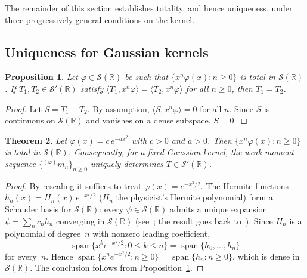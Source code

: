\documentclass[12pt]{article}
\newtheorem{theorem}{Theorem}[section]
\newtheorem{proposition}[theorem]{Proposition}
\theoremstyle{definition}
\newcommand{\R}{\mathbb{R}}
\begin{document}
The remainder of this section establishes totality, and hence uniqueness, under three progressively general conditions on the kernel.

\subsection{Uniqueness for Gaussian kernels}
\label{subsec:gauss-unique}

\begin{proposition}\label{prop:total-unique}
Let $\varphi \in \mathcal{S}(\R)$ be such that $\{x^n\varphi(x) : n \geq 0\}$ is total in $\mathcal{S}(\R)$.  If $T_1, T_2 \in \mathcal{S}'(\R)$ satisfy $\langle T_1, x^n\varphi\rangle = \langle T_2, x^n\varphi\rangle$ for all $n \geq 0$, then $T_1 = T_2$.
\end{proposition}

\begin{proof}
Let $S = T_1 - T_2$.  By assumption, $\langle S, x^n\varphi\rangle = 0$ for all $n$.  Since $S$ is continuous on $\mathcal{S}(\R)$ and vanishes on a dense subspace, $S = 0$.
\end{proof}

\begin{theorem}\label{thm:gauss-unique}
Let $\varphi(x) = c\,e^{-ax^2}$ with $c > 0$ and $a > 0$.  Then $\{x^n\varphi(x) : n \geq 0\}$ is total in $\mathcal{S}(\R)$.  Consequently, for a fixed Gaussian kernel, the weak moment sequence $\{{}^{(\varphi)}m_n\}_{n \geq 0}$ uniquely determines $T\in\mathcal{S}'(\R)$.
\end{theorem}

\begin{proof}
By rescaling it suffices to treat $\varphi(x) = e^{-x^2/2}$.  The Hermite functions $h_n(x) = H_n(x)\,e^{-x^2/2}$ ($H_n$ the physicist's Hermite polynomial) form a Schauder basis for $\mathcal{S}(\R)$: every $\psi \in \mathcal{S}(\R)$ admits a unique expansion $\psi = \sum_n c_n h_n$ converging in $\mathcal{S}(\R)$ (see~\cite{reed-simon1980}; the result goes back to~\cite{Schwartz1950}).  Since $H_n$ is a polynomial of degree~$n$ with nonzero leading coefficient,
\[
  \operatorname{span}\{x^k e^{-x^2/2} : 0 \leq k \leq n\}
  = \operatorname{span}\{h_0, \ldots, h_n\}
\]
for every~$n$.  Hence $\operatorname{span}\{x^n e^{-x^2/2} : n \geq 0\} = \operatorname{span}\{h_n : n \geq 0\}$, which is dense in $\mathcal{S}(\R)$.  The conclusion follows from Proposition~\ref{prop:total-unique}.
\end{proof}
\end{document}
